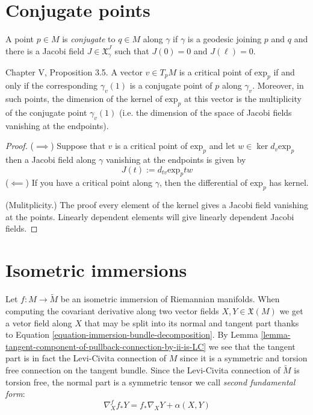 \section{Conjugate points}
\label{section-conjugate-points}

\begin{definition}
\label{definition-conjugate-points}
A point $p \in M$ is {\it conjugate} to $q \in M$ along $\gamma$ if $\gamma$ is
a geodesic joining $p$ and $q$ and there is a Jacobi field 
$J\in\mathfrak{X}_\gamma^J$ such that $J(0)=0$ and  $J(\ell)=0$.
\end{definition}

\begin{proposition}
\label{proposition-critical-points-exp}
\cite{doc} Chapter V, Proposition 3.5. A vector $v \in T_pM$ is a critical
point of $\text{exp}_p$ if and only if the corresponding 
$\gamma_v(1)$ is a conjugate point of $p$ along $\gamma_v$.
Moreover, in such points, the dimension of the kernel of 
$\text{exp}_p$ at this vector is the multiplicity
of the conjugate point $\gamma_v(1)$ 
(i.e. the dimension of the space of Jacobi fields vanishing 
at the endpoints).
\end{proposition}

\begin{proof}
($\implies$) Suppose that $v$ is a critical point of $\text{exp}_p$ and 
let $w \in \ker d_v \text{exp}_p$ then a Jacobi field along $\gamma$ 
vanishing at the endpoints is given by
$$
J(t):=d_{tv}\text{exp}_ptw
$$
($\impliedby$) If you have a critical point along $\gamma$, then the 
differential of $\text{exp}_p$ has kernel.

(Mulitplicity.) The proof every element of the kernel gives a Jacobi
 field vanishing at the points. Linearly dependent elements will give 
 linearly dependent Jacobi fields.
\end{proof}

\section{Isometric immersions}
\label{section-isometric-immersions}

Let $f:M \to \tilde{M}$ be an isometric immersion of Riemannian manifolds. When
computing the covariant derivative along two vector fields 
$X,Y \in\mathfrak{X}(M)$ we get a vetor field along $X$ that may be split into
its normal and tangent part thanks to Equation 
\ref{equation-immersion-bundle-decomposition}. By Lemma
\ref{lemma-tangent-component-of-pullback-connection-by-ii-is-LC} we see that the
 tangent part is
in fact the Levi-Civita connection of $M$ since it is a symmetric and torsion
free connection on the tangent bundle. Since the Levi-Civita connection of
$\tilde{M}$ is torsion free, the normal part is a
symmetric tensor we call {\it second fundamental form}:
\begin{equation}
\label{equation-second-fundamental-form}
\nabla^{f}_X f_*Y=f_*\nabla_XY+\alpha(X,Y)
\end{equation}

